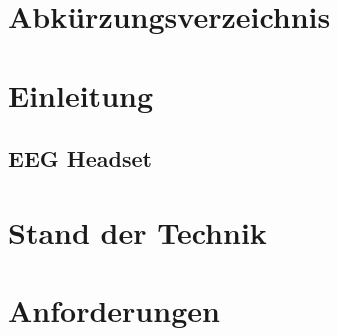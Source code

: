 
\graphicspath{{img/}{./}}

\newcommand{\docwidth}{12cm}


\pagestyle{empty}





\cleardoublepage 
\begingroup
\let\clearpage\relax

\chapter*{Abkürzungsverzeichnis}

%
\endgroup


\pagestyle{WissDokuNorm}

\cleardoublepage


\cleardoublepage
\chapter{Einleitung}


\section{EEG Headset}


\chapter{Stand der Technik}


\chapter{Anforderungen}


